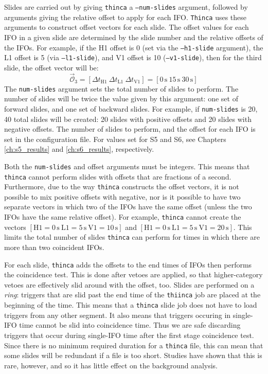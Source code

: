 Slides are carried out by giving \texttt{thinca} a \texttt{--num-slides} argument, followed by arguments giving the relative offset to apply for each \ac{IFO}. \texttt{Thinca} uses these arguments to construct offset vectors for each slide. The offset values for each \ac{IFO} in a given slide are determined by the slide number and the relative offsets of the \acp{IFO}. For example, if the H1 offset is 0 (set via the \texttt{--h1-slide} argument), the L1 offset is 5 (via \texttt{--l1-slide}), and V1 offset is 10 (\texttt{--v1-slide}), then for the third slide, the offset vector will be:
\begin{equation*}
\vec{\mathcal{O}}_3 = [\Delta t_{\mathrm{H1}} ~ \Delta t_{\mathrm{L1}} ~ \Delta t_{\mathrm{V1}}] = [0\,\mathrm{s} ~ 15\,\mathrm{s} ~ 30\,\mathrm{s}] 
\end{equation*}
The \texttt{num-slides} argument sets the total number of slides to perform. The number of slides will be twice the value given by this argument: one set of forward slides, and one set of backward slides. For example, if \texttt{num-slides} is 20, 40 total slides will be created: 20 slides with positive offsets and 20 slides with negative offsets. The number of slides to perform, and the offset for each \ac{IFO} is set in the configuration file. For values set for \ac{S5} and \ac{S6}, see Chapters \ref{ch:s5_results} and \ref{ch:s6_results}, respectively.

Both the \texttt{num-slides} and offset arguments must be integers. This means that \texttt{thinca} cannot perform slides with offsets that are fractions of a second. Furthermore, due to the way \texttt{thinca} constructs the offset vectors, it is not possible to mix positive offsets with negative, nor is it possible to have two separate vectors in which two of the \acp{IFO} have the same offset (unless the two \acp{IFO} have the same relative offset). For example, \texttt{thinca} cannot create the vectors $[\mathrm{H1} = 0\,\mathrm{s} ~ \mathrm{L1} = 5\,\mathrm{s} ~ \mathrm{V1} = 10\,\mathrm{s}]$ and $[\mathrm{H1} = 0\,\mathrm{s} ~ \mathrm{L1} = 5\,\mathrm{s} ~ \mathrm{V1} = 20\,\mathrm{s}]$. This limits the total number of slides \texttt{thinca} can perform for times in which there are more than two coincident \acp{IFO}.

For each slide, \texttt{thinca} adds the offsets to the end times of \acp{IFO} then performs the coincidence test. This is done after vetoes are applied, so that higher-category vetoes are effectively slid around with the offset, too. Slides are performed on a \emph{ring}: triggers that are slid past the end time of the \texttt{thiinca} job are placed at the beginning of the time. This means that a \texttt{thinca} slide job does not have to load triggers from any other segment. It also means that triggers occuring in single-\ac{IFO} time cannot be slid into coincidence time. Thus we are safe discarding triggers that occur during single-\ac{IFO} time after the first stage coincidence test. Since there is no minimum required duration for a \texttt{thinca} file, this can mean that some slides will be redundant if a file is too short. Studies have shown that this is rare, however, and so it has little effect on the background analysis.

